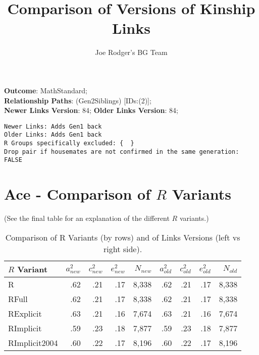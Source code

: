 \documentclass{article}\usepackage[]{graphicx}\usepackage[]{color}
\title{Comparison of Versions of Kinship Links}
\author{Joe Rodger's BG Team}
\makeatletter
\newenvironment{kframe}{%
 \def\at@end@of@kframe{}%
 \ifinner\ifhmode%
  \def\at@end@of@kframe{\end{minipage}}%
  \begin{minipage}{\columnwidth}%
 \fi\fi%
 \def\FrameCommand##1{\hskip\@totalleftmargin \hskip-\fboxsep
 \colorbox{shadecolor}{##1}\hskip-\fboxsep
     \hskip-\linewidth \hskip-\@totalleftmargin \hskip\columnwidth}%
 \MakeFramed {\advance\hsize-\width
   \@totalleftmargin\z@ \linewidth\hsize
   \@setminipage}}%
 {\par\unskip\endMakeFramed%
 \at@end@of@kframe}
\newenvironment{knitrout}{}{} %
\makeatother
\begin{document}
\maketitle
\setcounter{totalnumber}{8} %

\setlength{\parindent}{0pt}%











\textbf{Outcome}: MathStandard;\\
\textbf{Relationship Paths}: (Gen2Siblings) [IDs:(2)];\\
\textbf{Newer Links Version}: 84;
\textbf{Older Links Version}: 84;

\begin{knitrout}
\color{fgcolor}\begin{kframe}
\begin{verbatim}
Newer Links: Adds Gen1 back
Older Links: Adds Gen1 back
R Groups specifically excluded: {  }
Drop pair if housemates are not confirmed in the same generation: FALSE
\end{verbatim}
\end{kframe}
\end{knitrout}





\section{Ace - Comparison of $R$ Variants} 
(See the final table for an explanation of the different $R$ variants.)
\begin{table}[ht]
\centering
{\large
\begin{tabular}{l|rrrr|rrrr}
  \hline
$R$ Variant & $a_{new}^2$ & $c_{new}^2$ & $e_{new}^2$ & $N_{new}$ & $a_{old}^2$ & $c_{old}^2$ & $e_{old}^2$ & $N_{old}$ \\ 
  \hline
R & .62 & .21 & .17 & 8,338 & .62 & .21 & .17 & 8,338 \\ 
  RFull & .62 & .21 & .17 & 8,338 & .62 & .21 & .17 & 8,338 \\ 
  RExplicit & .63 & .21 & .16 & 7,674 & .63 & .21 & .16 & 7,674 \\ 
  RImplicit & .59 & .23 & .18 & 7,877 & .59 & .23 & .18 & 7,877 \\ 
  RImplicit2004 & .60 & .22 & .17 & 8,196 & .60 & .22 & .17 & 8,196 \\ 
   \hline
\end{tabular}
}
\caption{Comparison of R Variants (by rows) and of Links Versions (left vs right side).} 
\end{table}
\end{document}
